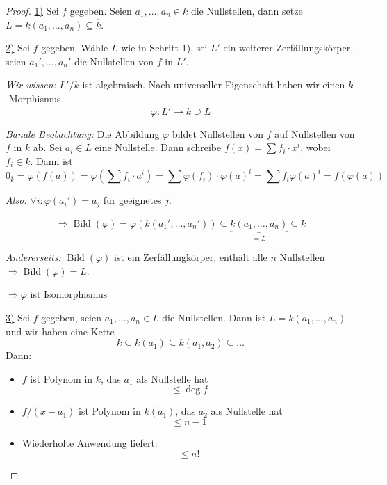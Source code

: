 \documentclass[a4paper,12pt,numbers=noenddot,parskip=full]{scrartcl}
\newcommand{\heading}{\underline}
\theoremstyle{dotless}
\theoremstyle{remark}
\begin{document}
	\begin{proof}
		\heading{1)} Sei $f$ gegeben. Seien $a_1, \dots, a_n \in \overline{k}$ die Nullstellen, dann setze $L = k(a_1, \dots, a_n) \subseteq \overline{k}$.
		
		\heading{2)} Sei $f$ gegeben. Wähle $L$ wie in Schritt 1), sei $L'$ ein weiterer Zerfällungskörper, seien $a_1', \dots, a_n'$ die Nullstellen von $f$ in $L'$.
		
		\textit{Wir wissen:} $L'/k$ ist algebraisch. Nach universeller Eigenschaft haben wir einen $k$-Morphismus
		\begin{equation*}
			\varphi: L' \to \overline{k} \supseteq L
		\end{equation*}
		
		\textit{Banale Beobachtung:} Die Abbildung $\varphi$ bildet Nullstellen von $f$ auf Nullstellen von $f$ in $\overline{k}$ ab. Sei $a_i \in L$ eine Nullstelle. Dann schreibe $f(x) = \sum f_i \cdot x^i$, wobei $f_i \in k$. Dann ist
		\begin{equation*}
			0_{\overline{k}} = \varphi(f(a)) = \varphi \left( \sum f_i \cdot a^i \right) = \sum \varphi(f_i) \cdot \varphi(a)^i = \sum f_i \varphi(a)^i = f(\varphi(a))
		\end{equation*}
		
		\textit{Also:} $\forall i: \varphi(a_i') = a_j$ für geeignetes $j$.
		
		\begin{equation*}
			\Rightarrow \operatorname{Bild}(\varphi) = \varphi(k(a_1', \dots, a_n')) \subseteq \underbrace{k(a_1, \dots, a_n)}_{=L} \subseteq \overline{k}
		\end{equation*}
		
		\textit{Andererseits:} $\operatorname{Bild}(\varphi)$ ist ein Zerfällungkörper, enthält alle $n$ Nullstellen $\Rightarrow \operatorname{Bild}(\varphi) = L$.
		
		$\Rightarrow \varphi$ ist Isomorphismus
		
		\heading{3)} Sei $f$ gegeben, seien $a_1, \dots, a_n \in L$ die Nullstellen. Dann ist $L = k(a_1, \dots, a_n)$ und wir haben eine Kette
		\begin{equation*}
			k \subseteq k(a_1) \subseteq k(a_1, a_2) \subseteq \dots
		\end{equation*}
		Dann:
		\begin{itemize}
			\item $f$ ist Polynom in $k$, das $a_1$ als Nullstelle hat
			\begin{equation*}
				[k(a_1) : k] \leq \deg f
			\end{equation*}
			\item $f/(x-a_1)$ ist Polynom in $k(a_1)$, das $a_2$ als Nullstelle hat
			\begin{equation*}
				[k(a_1, a_2) : k(a_1)] \leq n - 1
			\end{equation*}
			\item Wiederholte Anwendung liefert:
			\begin{equation*}
				[L:k] \leq n!
			\end{equation*}
		\end{itemize}
		
	\end{proof}
\end{document}
